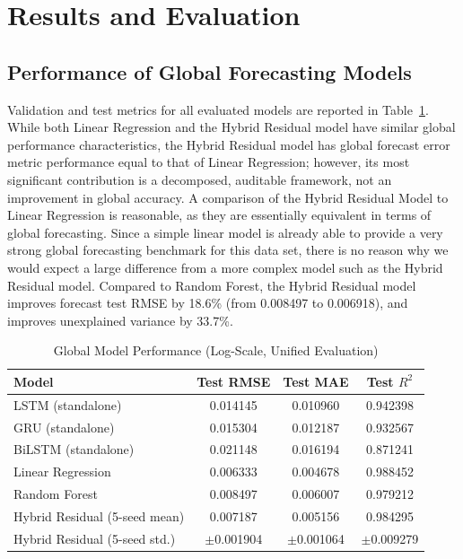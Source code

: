 \documentclass{ieeeaccess}
\begin{document}
\section{Results and Evaluation}
\subsection{Performance of Global Forecasting Models}

Validation and test metrics for all evaluated models are reported in Table~\ref{tab:global_performance}. While both Linear Regression and the Hybrid Residual model have similar global performance characteristics, the Hybrid Residual model has global forecast error metric performance equal to that of Linear Regression; however, its most significant contribution is a decomposed, auditable framework, not an improvement in global accuracy. A comparison of the Hybrid Residual Model to Linear Regression is reasonable, as they are essentially equivalent in terms of global forecasting. Since a simple linear model is already able to provide a very strong global forecasting benchmark for this data set, there is no reason why we would expect a large difference from a more complex model such as the Hybrid Residual model. Compared to Random Forest, the Hybrid Residual model improves forecast test RMSE by 18.6\% (from 0.008497 to 0.006918), and improves unexplained variance by 33.7\%.
\begin{table}[!t]
\caption{Global Model Performance (Log-Scale, Unified Evaluation)}
\label{tab:global_performance}
\centering
\begin{tabular}{lccc}
\toprule
Model & Test RMSE & Test MAE & Test $R^2$ \\
\midrule
LSTM (standalone) & 0.014145 & 0.010960 & 0.942398 \\
GRU (standalone) & 0.015304 & 0.012187 & 0.932567 \\
BiLSTM (standalone) & 0.021148 & 0.016194 & 0.871241 \\
Linear Regression & 0.006333 & 0.004678 & 0.988452 \\
Random Forest & 0.008497 & 0.006007 & 0.979212 \\
Hybrid Residual (5-seed mean) & 0.007187 & 0.005156 & 0.984295 \\
Hybrid Residual (5-seed std.) & $\pm$0.001904 & $\pm$0.001064 & $\pm$0.009279 \\
\bottomrule
\end{tabular}
\end{table}
\end{document}
